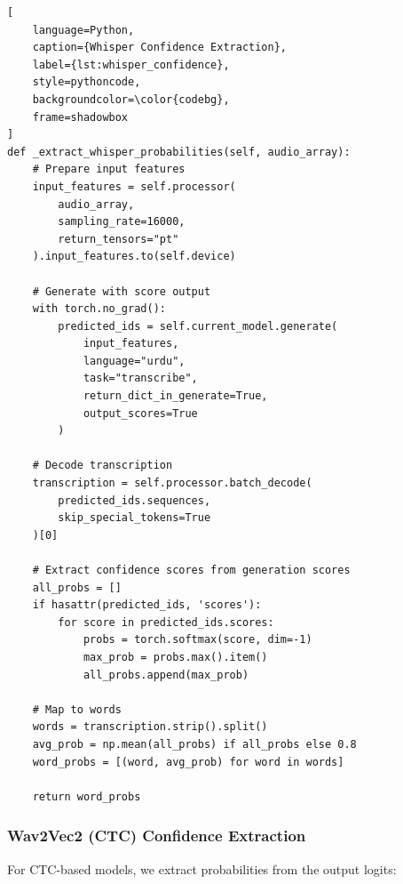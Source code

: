 \begin{lstlisting}[
    language=Python,
    caption={Whisper Confidence Extraction},
    label={lst:whisper_confidence},
    style=pythoncode,
    backgroundcolor=\color{codebg},
    frame=shadowbox
]
def _extract_whisper_probabilities(self, audio_array):
    # Prepare input features
    input_features = self.processor(
        audio_array, 
        sampling_rate=16000, 
        return_tensors="pt"
    ).input_features.to(self.device)
    
    # Generate with score output
    with torch.no_grad():
        predicted_ids = self.current_model.generate(
            input_features,
            language="urdu",
            task="transcribe",
            return_dict_in_generate=True,
            output_scores=True
        )
    
    # Decode transcription
    transcription = self.processor.batch_decode(
        predicted_ids.sequences, 
        skip_special_tokens=True
    )[0]
    
    # Extract confidence scores from generation scores
    all_probs = []
    if hasattr(predicted_ids, 'scores'):
        for score in predicted_ids.scores:
            probs = torch.softmax(score, dim=-1)
            max_prob = probs.max().item()
            all_probs.append(max_prob)
    
    # Map to words
    words = transcription.strip().split()
    avg_prob = np.mean(all_probs) if all_probs else 0.8
    word_probs = [(word, avg_prob) for word in words]
    
    return word_probs
\end{lstlisting}

\subsubsection{Wav2Vec2 (CTC) Confidence Extraction}

For CTC-based models, we extract probabilities from the output logits:

